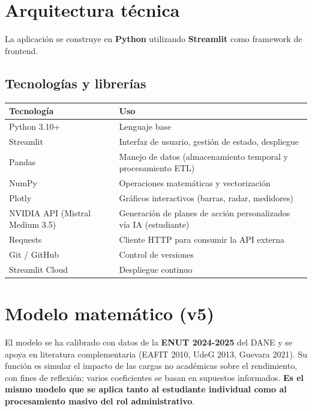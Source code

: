 \documentclass[12pt, spanish]{article}
\begin{document}
\section{Arquitectura técnica}

La aplicación se construye en \textbf{Python} utilizando \textbf{Streamlit} como framework de frontend.

\subsection{Tecnologías y librerías}
\begin{table}[H]
\centering
\begin{tabular}{ll}
\toprule
\textbf{Tecnología} & \textbf{Uso} \\
\midrule
Python 3.10+ & Lenguaje base \\
Streamlit & Interfaz de usuario, gestión de estado, despliegue \\
Pandas & Manejo de datos (almacenamiento temporal y procesamiento ETL) \\
NumPy & Operaciones matemáticas y vectorización \\
Plotly & Gráficos interactivos (barras, radar, medidores) \\
NVIDIA API (Mistral Medium 3.5) & Generación de planes de acción personalizados vía IA (estudiante) \\
Requests & Cliente HTTP para consumir la API externa \\
Git / GitHub & Control de versiones \\
Streamlit Cloud & Despliegue continuo \\
\bottomrule
\end{tabular}
\end{table}

\section{Modelo matemático (v5)}

El modelo se ha calibrado con datos de la \textbf{ENUT 2024-2025} del DANE y se apoya en literatura complementaria (EAFIT 2010, UdeG 2013, Guevara 2021). Su función es simular el impacto de las cargas no académicas sobre el rendimiento, con fines de reflexión; varios coeficientes se basan en supuestos informados. \textbf{Es el mismo modelo que se aplica tanto al estudiante individual como al procesamiento masivo del rol administrativo}.
\end{document}
